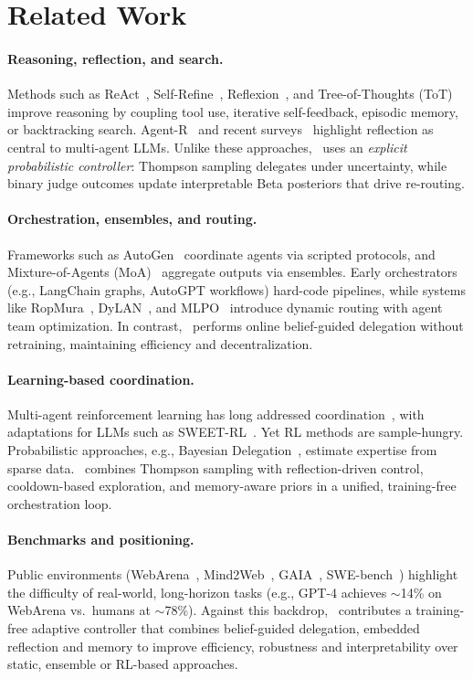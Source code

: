 \section{Related Work}
\label{sec:related}

\paragraph{Reasoning, reflection, and search.}
Methods such as ReAct~\cite{react2023}, Self-Refine~\cite{selfrefine2023}, Reflexion~\cite{reflexion2023}, and Tree-of-Thoughts (ToT)~\cite{tot2023} improve reasoning by coupling tool use, iterative self-feedback, episodic memory, or backtracking search. Agent-R~\cite{agentr2025} and recent surveys~\cite{guo2024survey} highlight reflection as central to multi-agent LLMs. Unlike these approaches, \method\ uses an \emph{explicit probabilistic controller}: Thompson sampling delegates under uncertainty, while binary judge outcomes update interpretable Beta posteriors that drive re-routing.

\paragraph{Orchestration, ensembles, and routing.}
Frameworks such as AutoGen~\cite{autogen2023} coordinate agents via scripted protocols, and Mixture-of-Agents (MoA)~\cite{moa2024} aggregate outputs via ensembles. Early orchestrators (e.g., LangChain graphs, AutoGPT workflows) hard-code pipelines, while systems like RopMura~\cite{ropmura2025}, DyLAN~\cite{dylan2023}, and MLPO~\cite{mlpo2025} introduce dynamic routing with agent team optimization. In contrast, \method\ performs online belief-guided delegation without retraining, maintaining efficiency and decentralization.

\paragraph{Learning-based coordination.}
Multi-agent reinforcement learning has long addressed coordination~\cite{lowe2017multi,foerster2018counterfactual}, with adaptations for LLMs such as SWEET-RL~\cite{zhou2025sweetrl}. Yet RL methods are sample-hungry. Probabilistic approaches, e.g., Bayesian Delegation~\cite{Wu21}, estimate expertise from sparse data. \method\ combines Thompson sampling with reflection-driven control,
cooldown-based exploration, and memory-aware priors in a unified,
training-free orchestration loop.

\paragraph{Benchmarks and positioning.}
Public environments (WebArena~\cite{webarena2023}, Mind2Web~\cite{mind2web2023}, GAIA~\cite{gaia2023}, SWE-bench~\cite{swebench2023}) highlight the difficulty of real-world, long-horizon tasks (e.g., GPT-4 achieves $\sim$14\% on WebArena vs.\ humans at $\sim$78\%). Against this backdrop, \method\ contributes a training-free adaptive controller that combines belief-guided delegation, embedded reflection and memory to improve efficiency, robustness and interpretability over static, ensemble or RL-based approaches.
